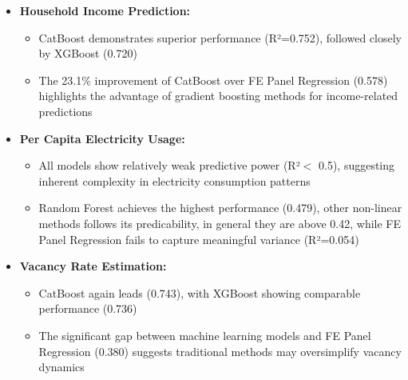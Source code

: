 \documentclass{article}
\begin{document}
\begin{itemize}
    \item \textbf{Household Income Prediction:}
    \begin{itemize}
        \item CatBoost demonstrates superior performance (R²=0.752), followed closely by XGBoost (0.720)
        \item The 23.1\% improvement of CatBoost over FE Panel Regression (0.578) highlights the advantage of gradient boosting methods for income-related predictions
    \end{itemize}
    
    \item \textbf{Per Capita Electricity Usage:}
    \begin{itemize}
        \item All models show relatively weak predictive power (R²$<$ 0.5), suggesting inherent complexity in electricity consumption patterns
        \item Random Forest achieves the highest performance (0.479), other non-linear methods follows its predicability, in general they are above 0.42, while FE Panel Regression fails to capture meaningful variance (R²=0.054)
    \end{itemize}
    
    \item \textbf{Vacancy Rate Estimation:}
    \begin{itemize}
        \item CatBoost again leads (0.743), with XGBoost showing comparable performance (0.736)
        \item The significant gap between machine learning models and FE Panel Regression (0.380) suggests traditional methods may oversimplify vacancy dynamics
    \end{itemize}
\end{itemize}
\end{document}
